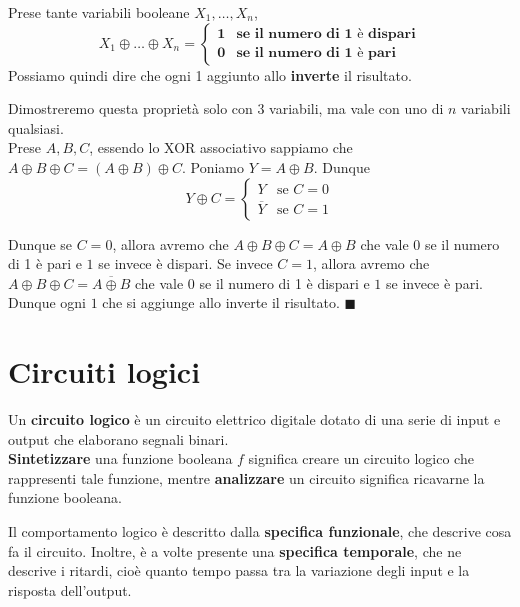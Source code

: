 \documentclass[11pt, a4paper, titlepage, oneside]{scrbook}
\begin{document}
\begin{Proprieta}
\label{prop-proprietà-dispari-XOR}
Prese tante variabili booleane $X_1, \ldots, X_n$, 
\[
X_1 \oplus \ldots \oplus X_n = \begin{cases}
    \bm{1} & \textbf{se il numero di 1 è dispari} \\
    \bm{0} & \textbf{se il numero di 1 è pari} 
\end{cases}
\]
Possiamo quindi dire che ogni 1 aggiunto allo  \textbf{inverte} il risultato.
\end{Proprieta}

\Dimostrazione \nopagebreak

Dimostreremo questa proprietà solo con 3 variabili, ma vale con uno  di $n$ variabili qualsiasi. \\
Prese $A,B,C$, essendo lo XOR associativo sappiamo che $A \oplus B \oplus C = (A \oplus B) \oplus C$. Poniamo $Y = A \oplus B$. Dunque
\[
Y \oplus C =
\begin{cases}
Y & \text{se } C = 0 \\
\overline{Y} & \text{se } C = 1 
\end{cases}
\]

Dunque se $C = 0$, allora avremo che $A \oplus B \oplus C = A \oplus B$ che vale $0$ se il numero di 1 è pari e $1$ se invece è dispari. Se invece $C = 1$, allora avremo che $A \oplus B \oplus C = \overline{A \oplus B}$ che vale $0$ se il numero di 1 è dispari e $1$ se invece è pari. Dunque ogni $1$ che si aggiunge allo  inverte il risultato. $\blacksquare$

\section{Circuiti logici}

\begin{Definizione}
\label{def-circuito-logico}
Un \textbf{circuito logico} è un circuito elettrico digitale dotato di una serie di input e output che elaborano segnali binari.  \\
\NB \textbf{Sintetizzare} una funzione booleana $f$ significa creare un circuito logico che rappresenti tale funzione, mentre \textbf{analizzare} un circuito significa ricavarne la funzione booleana.
\end{Definizione}
Il comportamento logico è descritto dalla \textbf{specifica funzionale}, che descrive cosa fa il circuito. Inoltre, è a volte presente una \textbf{specifica temporale}, che ne descrive i ritardi, cioè quanto tempo passa tra la variazione degli input e la risposta dell'output.
\end{document}
